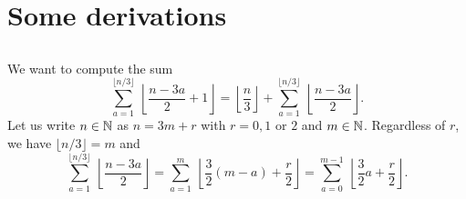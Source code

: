 \section{Some derivations}

    \subsection{}\label{app:compsum}

        We want to compute the sum
        \begin{equation}
            \sum^{\lfloor n/3\rfloor}_{a=1}~\left\lfloor \frac{n-3a}{2}+1\right\rfloor = \left\lfloor \frac{n}{3}\right\rfloor + \sum^{\lfloor n/3\rfloor}_{a=1}~\left\lfloor \frac{n-3a}{2}\right\rfloor.
        \end{equation}
        Let us write $n\in\mathbb{N}$ as $n=3m+r$ with $r=0,1$ or $2$ and $m\in\mathbb{N}$. Regardless of $r$, we have $\lfloor n/3\rfloor=m$ and
        \begin{equation}
            \sum^{\lfloor n/3\rfloor}_{a=1}~\left\lfloor \frac{n-3a}{2}\right\rfloor = \sum^{m}_{a=1}~\left\lfloor \frac{3}{2}(m-a)+\frac{r}{2}\right\rfloor = \sum^{m-1}_{a=0}~\left\lfloor \frac{3}{2}a+\frac{r}{2}\right\rfloor.\label{eq:sumfloor}
        \end{equation}
